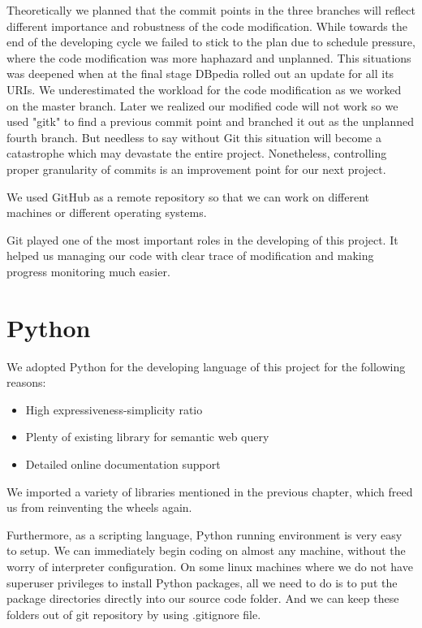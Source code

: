 \documentclass[12pt]{cls}
\begin{document}
Theoretically we planned that the commit points in the three branches will reflect different importance and robustness of the code modification. While towards the end of the developing cycle we failed to stick to the plan due to schedule pressure, where the code modification was more haphazard and unplanned. This situations was deepened when at the final stage DBpedia rolled out an update for all its URIs. We underestimated the workload for the code modification as we worked on the master branch. Later we realized our modified code will not work so we used "gitk" to find a previous commit point and branched it out as the unplanned fourth branch. But needless to say without Git this situation will become a catastrophe which may devastate the entire project. Nonetheless, controlling proper granularity of commits is an improvement point for our next project.

We used GitHub as a remote repository so that we can work on different machines or different operating systems.

Git played one of the most important roles in the developing of this project. It helped us managing our code with clear trace of modification and making progress monitoring much easier.

\section{Python}

We adopted Python for the developing language of this project for the following reasons:

\begin{itemize}
\item High expressiveness-simplicity ratio
\item Plenty of existing library for semantic web query
\item Detailed online documentation support
\end{itemize}

We imported a variety of libraries mentioned in the previous chapter, which freed us from reinventing the wheels again.

Furthermore, as a scripting language, Python running environment is very easy to setup. We can immediately begin coding on almost any machine, without the worry of interpreter configuration. On some linux machines where we do not have superuser privileges to install Python packages, all we need to do is to put the package directories directly into our source code folder. And we can keep these folders out of git repository by using .gitignore file.
\end{document}
